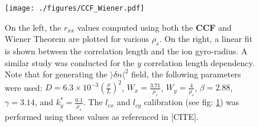 \documentclass[11pt,openany]{report}
\begin{document}
\begin{figure}[H]
    \centering
    \hspace*{-0cm}\texttt{[image: ./figures/CCF\_Wiener.pdf]}
    \caption{On the left, the $r_{xx}$ values computed using both the \textbf{CCF} and Wiener Theorem are plotted for various $\rho_s$. On the right, a linear fit is shown between the correlation length and the ion gyro-radius. A similar study was conducted for the $y$ correlation length dependency. Note that for generating the $\rangle \delta n \langle^2$ field, the following parameters were used: $D = 6.3 \times 10^{-3} (\frac{\rho}{L})^2$, $W_x = \frac{3.71}{\rho_s}$, $W_y = \frac{4}{\rho_s}$, $\beta = 2.88$, $\gamma = 3.14$, and $k_y^* = \frac{0.1}{\rho_s}$. The $l_{cx}$ and $l_{cy}$ calibration (see fig: \ref{Wiener}) was performed using these values as referenced in [CITE].}
    \label{Wiener}
\end{figure}
\end{document}

